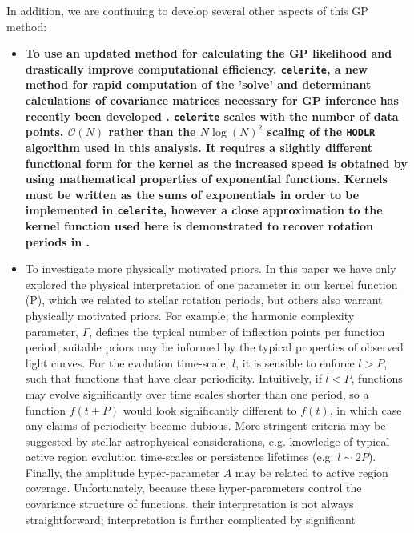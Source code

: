 \documentclass[a4paper,fleqn,usenatbib,useAMS]{mnras}
\begin{document}
In addition, we are continuing to develop several other aspects of this GP
method:
\begin{itemize}
    \item{{\bf To use an updated method for calculating the GP likelihood and
    drastically improve computational efficiency.
        {\tt celerite}, a new method for rapid computation of the 'solve' and
        determinant calculations of covariance matrices necessary for GP
        inference has recently been developed \citep{Foremanmackey2017}.
        {\tt celerite} scales with the number of data points, $\mathcal{O}(N)$
        rather than the $N\log(N)^2$ scaling of the {\tt HODLR} algorithm used
        in this analysis.
        It requires a slightly different functional form for the kernel as the
        increased speed is obtained by using mathematical properties of
        exponential functions.
        Kernels must be written as the sums of exponentials in order to be
        implemented in {\tt celerite}, however a close approximation to the
        kernel function used here is demonstrated to recover rotation periods
        in \citet{Foremanmackey2017}.}}
\item{To investigate more physically motivated priors.
        In this paper we have only explored the physical interpretation of one
        parameter in our kernel function (P), which we related to stellar
        rotation periods, but others also warrant physically motivated priors.
        For example, the harmonic complexity parameter, $\Gamma$, defines the
        typical number of inflection points per function period; suitable
        priors may be informed by the typical properties of observed light
        curves.
        For the evolution time-scale, $l$,  it is sensible to enforce $l > P$,
        such that functions that have clear periodicity.
        Intuitively, if $l < P$, functions may evolve significantly over time
        scales shorter than one period, so a function $f(t+P)$ would look
        significantly different to $f(t)$, in which case any claims of
        periodicity become dubious.
        More stringent criteria may be suggested by stellar astrophysical
        considerations, e.g. knowledge of typical active region evolution
        time-scales or persistence lifetimes (e.g. $l\sim2P$).
        Finally, the amplitude hyper-parameter $A$ may be related to active
        region coverage.
        Unfortunately, because these hyper-parameters control the covariance
        structure of functions, their interpretation is not always
        straightforward; interpretation is further complicated by significant
}
\end{itemize}
\end{document}
